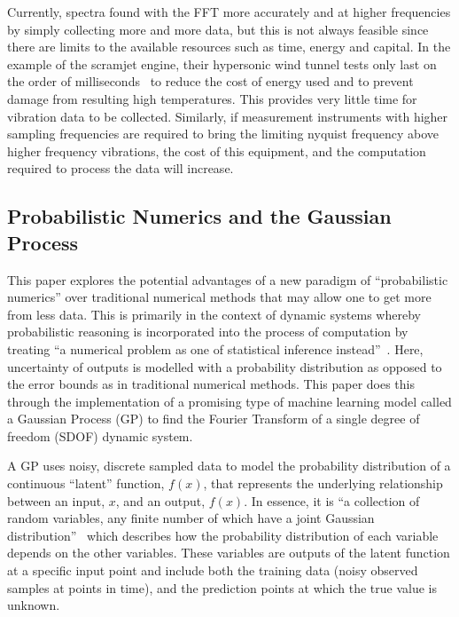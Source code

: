 \documentclass[12pt]{article}
\begin{document}
    Currently, spectra found with the FFT more accurately and at higher frequencies by simply collecting more and more data, but this is not always feasible since there are limits to the available resources such as time, energy and capital.
    In the example of the scramjet engine, their hypersonic wind tunnel tests only last on the order of milliseconds~\cite{Mec463} to reduce the cost of energy used and  to prevent damage from resulting high temperatures.
    This provides very little time for vibration data to be collected.
    Similarly, if measurement instruments with higher sampling frequencies are required to bring the limiting nyquist frequency above higher frequency vibrations, the cost of this equipment, and the computation required to process the data will increase.


    \subsection{Probabilistic Numerics and the Gaussian Process}
    This paper explores the potential advantages of a new paradigm of ``probabilistic numerics'' over traditional numerical methods that may allow one to get more from less data.
    This is primarily in the context of dynamic systems whereby probabilistic reasoning is incorporated into the process of computation by treating ``a numerical problem as one of statistical inference instead''~\cite{ProbabilisticNumerics2023}.
    Here, uncertainty of outputs is modelled with a probability distribution as opposed to the error bounds as in traditional numerical methods.
    This paper does this through the implementation of a promising type of machine learning model called a Gaussian Process (GP) to find the Fourier Transform of a single degree of freedom (SDOF) dynamic system.

    A GP uses noisy, discrete sampled data to model the probability distribution of a continuous ``latent'' function, $f(x)$, that represents the underlying relationship between an input, $x$, and an output, $f(x)$.
    In essence, it is ``a collection of random variables, any finite number of which have a joint Gaussian distribution''~\cite{rasmussen2006gaussian} which describes how the probability distribution of each variable depends on the other variables.
    These variables are outputs of the latent function at a specific input point and include both the training data (noisy observed samples at points in time), and the prediction points at which the true value is unknown.
\end{document}
